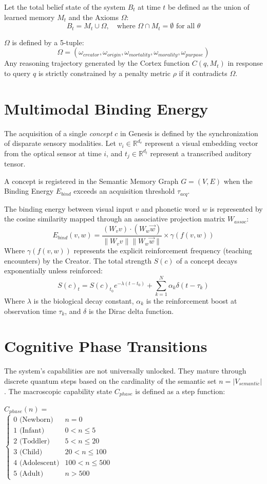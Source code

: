 \documentclass[11pt,twocolumn]{article}
\begin{document}
Let the total belief state of the system $B_t$ at time $t$ be defined as the union of learned memory $M_t$ and the Axioms $\Omega$:
\[
B_t = M_t \cup \Omega, \quad \text{where } \Omega \cap M_t = \emptyset \text{ for all } \theta
\]

$\Omega$ is defined by a 5-tuple:
\[
\Omega = (\omega_{creator}, \omega_{origin}, \omega_{mortality}, \omega_{morality}, \omega_{purpose})
\]
Any reasoning trajectory generated by the Cortex function $C(q, M_t)$ in response to query $q$ is strictly constrained by a penalty metric $\rho$ if it contradicts $\Omega$.

\section{Multimodal Binding Energy}
The acquisition of a single \textit{concept} $c$ in Genesis is defined by the synchronization of disparate sensory modalities. Let $v_i \in \mathbb{R}^{d_v}$ represent a visual embedding vector from the optical sensor at time $i$, and $t_j \in \mathbb{R}^{d_t}$ represent a transcribed auditory tensor.

A concept is registered in the Semantic Memory Graph $G = (V, E)$ when the Binding Energy $E_{bind}$ exceeds an acquisition threshold $\tau_{acq}$.

The binding energy between visual input $v$ and phonetic word $w$ is represented by the cosine similarity mapped through an associative projection matrix $W_{assoc}$:
\[
E_{bind}(v, w) = \frac{(W_v v) \cdot (W_w \vec{w})}{\|W_v v\| \|W_w \vec{w}\|} \times \gamma(f(v,w))
\]
Where $\gamma(f(v,w))$ represents the explicit reinforcement frequency (teaching encounters) by the Creator. The total strength $S(c)$ of a concept decays exponentially unless reinforced:
\[
S(c)_t = S(c)_{t_0} e^{-\lambda (t - t_0)} + \sum_{k=1}^N \alpha_k \delta(t - \tau_k)
\]
Where $\lambda$ is the biological decay constant, $\alpha_k$ is the reinforcement boost at observation time $\tau_k$, and $\delta$ is the Dirac delta function.

\section{Cognitive Phase Transitions}
The system's capabilities are not universally unlocked. They mature through discrete quantum steps based on the cardinality of the semantic set $n = |V_{semantic}|$. The macroscopic capability state $C_{phase}$ is defined as a step function:
\begin{center}
$C_{phase}(n) = $ \\
$\begin{cases} 
0 \text{ (Newborn)} & n = 0 \\
1 \text{ (Infant)} & 0 < n \leq 5 \\
2 \text{ (Toddler)} & 5 < n \leq 20 \\
3 \text{ (Child)} & 20 < n \leq 100 \\
4 \text{ (Adolescent)} & 100 < n \leq 500 \\
5 \text{ (Adult)} & n > 500
\end{cases}$
\end{center}
\end{document}
